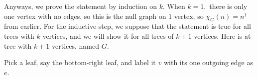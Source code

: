 Anyways, we prove the statement by induction on $k.$ When $k=1,$ there is only one vertex with no edges, so this is the null graph on $1$ vertex, so $\chi_G(n)=n^1$ from earlier. For the inductive step, we suppose that the statement is true for all trees with $k$ vertices, and we will show it for all trees of $k+1$ vertices. Here is at tree with $k+1$ vertices, named $G.$
\begin{center}
\end{center}
Pick a leaf, say the bottom-right leaf, and label it $v$ with its one outgoing edge as $e.$

